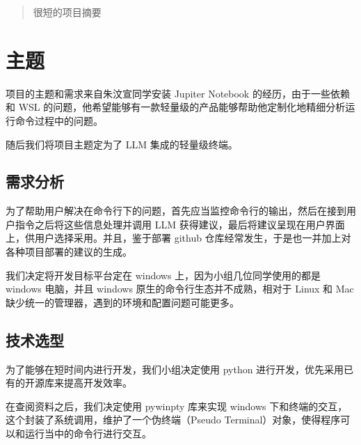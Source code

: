 \documentclass{article}
\theoremstyle{plain}
\theoremstyle{definition}
\theoremstyle{remark}
\begin{document}

\begin{abstract}
很短的项目摘要
\end{abstract}

\section{主题}

项目的主题和需求来自朱汶宣同学安装 Jupiter Notebook 的经历，由于一些依赖和 WSL 的问题，他希望能够有一款轻量级的产品能够帮助他定制化地精细分析运行命令过程中的问题。

随后我们将项目主题定为了 LLM 集成的轻量级终端。

\subsection{需求分析}

为了帮助用户解决在命令行下的问题，首先应当监控命令行的输出，然后在接到用户指令之后将这些信息处理并调用 LLM 获得建议，最后将建议呈现在用户界面上，供用户选择采用。并且，鉴于部署 github 仓库经常发生，于是也一并加上对各种项目部署的建议的生成。

我们决定将开发目标平台定在 windows 上，因为小组几位同学使用的都是 windows 电脑，并且 windows 原生的命令行生态并不成熟，相对于 Linux 和 Mac 缺少统一的管理器，遇到的环境和配置问题可能更多。

\subsection{技术选型}

为了能够在短时间内进行开发，我们小组决定使用 python 进行开发，优先采用已有的开源库来提高开发效率。

在查阅资料之后，我们决定使用 pywinpty 库来实现 windows 下和终端的交互，这个封装了系统调用，维护了一个伪终端（Pseudo Terminal）对象，使得程序可以和运行当中的命令行进行交互。
\end{document}
